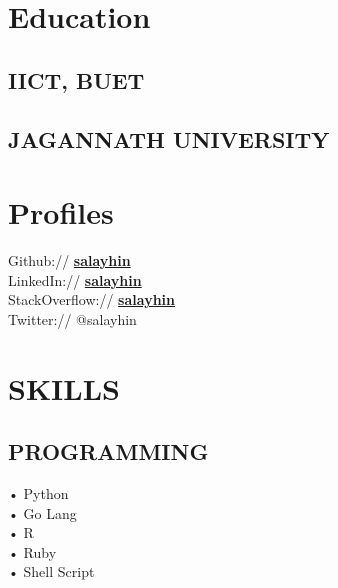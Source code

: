 \documentclass[letterpaper]{deedy-resume} %
\begin{document}
\begin{minipage}[t]{0.33\textwidth} %


\section{Education} 

\subsection{IICT, BUET}


\sectionspace %

\subsection{JAGANNATH UNIVERSITY}

\sectionspace %


\section{Profiles} 
Github:// \href{https://github.com/salayhin}{\bf salayhin} \\
LinkedIn:// \href{https://www.linkedin.com/in/salayhin}{\bf salayhin} \\
StackOverflow:// \href{https://stackoverflow.com/users/717600/sirajus-salayhin}{\bf salayhin} \\
Twitter:// @salayhin
\sectionspace %


\section{SKILLS}
\subsection{PROGRAMMING}
• Python \\
• Go Lang \\
• R \\
• Ruby \\
• Shell Script\\
\sectionspace %



\end{minipage}
\end{document}
